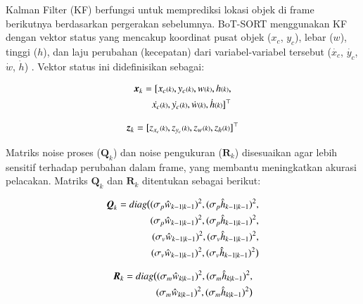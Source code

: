Kalman Filter (KF) berfungsi untuk memprediksi lokasi objek di frame berikutnya berdasarkan pergerakan sebelumnya. BoT-SORT menggunakan KF dengan vektor status yang mencakup koordinat pusat objek ($x_c$, $y_c$), lebar ($w$), tinggi ($h$), dan laju perubahan (kecepatan) dari variabel-variabel tersebut ($\dot{x_c}$, $\dot{y_c}$, $\dot{w}$, $\dot{h}$) \parencite{bewley2016simple, wojke2017simple}. Vektor status ini didefinisikan sebagai:

\begin{equation}
  \begin{split}
    \vb*{x}_k = [x_{c}{\scriptstyle(k)}, y_{c}{\scriptstyle(k)}, w{\scriptstyle(k)}, h{\scriptstyle(k)}, \\        
    \dot{x_{c}}{\scriptstyle(k)}, \dot{y_{c}}{\scriptstyle(k)}, \dot{w}{\scriptstyle(k)}, \dot{h}{\scriptstyle(k)}]^\top
  \end{split}
\end{equation}

\begin{equation}
  \vb*{z}_k = [z_{x_c}{\scriptstyle(k)}, z_{y_c}{\scriptstyle(k)}, z_{w}{\scriptstyle(k)}, z_{h}{\scriptstyle(k)}]^\top
\end{equation}

Matriks noise proses ($\mathbf{Q}_k$) dan noise pengukuran ($\mathbf{R}_k$) disesuaikan agar lebih sensitif terhadap perubahan dalam frame, yang membantu meningkatkan akurasi pelacakan. Matriks $\mathbf{Q}_k$ dan $\mathbf{R}_k$ ditentukan sebagai berikut:

\begin{equation}
  \begin{split}
    \vb*{Q}_k = diag\big{(} (\sigma_{p} \hat{w}_{k-1|k-1})^2, (\sigma_{p} \hat{h}_{k-1|k-1})^2, \\
    (\sigma_{p} \hat{w}_{k-1|k-1})^2, (\sigma_{p} \hat{h}_{k-1|k-1})^2, \\
    (\sigma_{v} \hat{w}_{k-1|k-1})^2, (\sigma_{v} \hat{h}_{k-1|k-1})^2, \\ 
    (\sigma_{v} \hat{w}_{k-1|k-1})^2 ,(\sigma_{v} \hat{h}_{k-1|k-1})^2\big{)}
  \end{split}
\end{equation}

\begin{equation}
  \begin{split}
      \vb*{R}_k = diag\big{(}(\sigma_{m} \hat{w}_{k|k-1})^2, (\sigma_{m} \hat{h}_{k|k-1})^2, \\
      (\sigma_{m} \hat{w}_{k|k-1})^2, (\sigma_{m} \hat{h}_{k|k-1})^2\big{)} 
  \end{split}
\end{equation}

